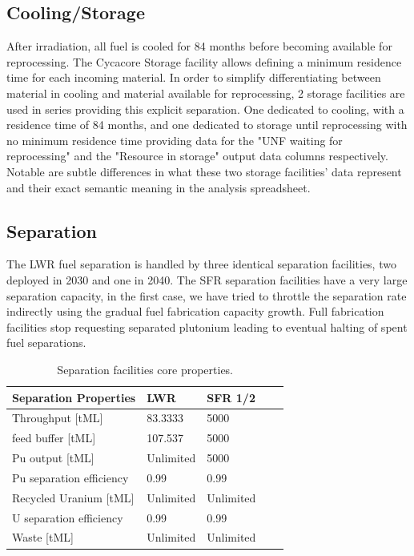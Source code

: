 \documentclass[12pt]{article}
\begin{document}
\subsection{Cooling/Storage}

After irradiation, all fuel is cooled for 84 months before becoming available
for reprocessing.  The Cycacore Storage facility allows defining a minimum
residence time for each incoming material.  In order to simplify
differentiating between material in cooling and material available for
reprocessing, 2 storage facilities are used in series providing this explicit
separation. One dedicated to cooling, with a residence time of 84 months, and
one dedicated to storage until reprocessing with no minimum residence time
providing data for the "UNF waiting for reprocessing" and the "Resource in
storage" output data columns respectively.  Notable are subtle differences in
what these two storage facilities' data represent and their exact semantic
meaning in the analysis spreadsheet.

\subsection{Separation}

The LWR fuel separation is handled by three identical separation facilities,
two deployed in 2030 and one in 2040. The SFR separation facilities have a
very large separation capacity, in the first case, we have tried to throttle
the separation rate indirectly using the gradual fuel fabrication capacity
growth. Full fabrication facilities stop requesting separated plutonium
leading to eventual halting of spent fuel separations.

\begin{table}[h!]
    \centering
    \begin{tabular}{lllll}
    \hline
    Separation Properties	&	LWR		&	SFR 1/2	\\
    \hline
    Throughput [tML]		&	83.3333	&	5000		\\
    feed buffer [tML]		&	107.537	&	5000		\\
    Pu output  [tML]		&	Unlimited	&	5000		\\
    Pu separation efficiency	&	0.99		&	0.99		\\
    Recycled Uranium [tML]	&	Unlimited	&	Unlimited	\\
    U separation efficiency	&	0.99		&	0.99		\\
    Waste [tML]			&	Unlimited	&	Unlimited	\\
    \hline
    \end{tabular}
    \caption{Separation facilities core properties. }
    \label{tab:separation_1}
\end{table}
\end{document}
